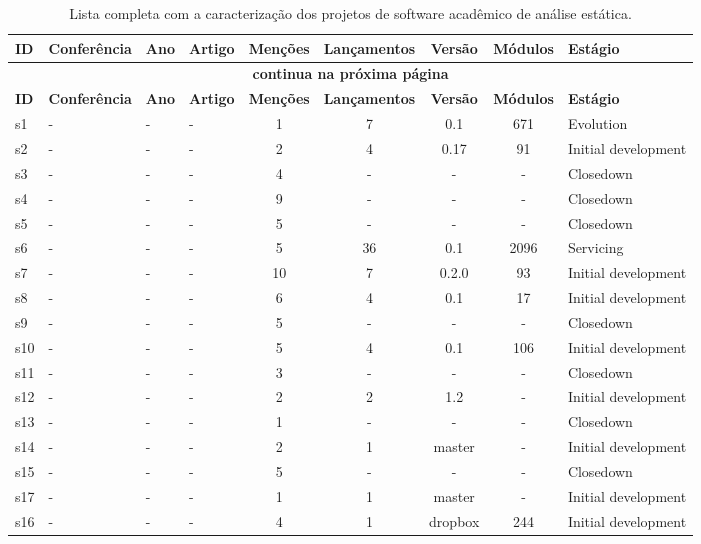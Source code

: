 \begin{longtable}{| l | l | l | l | c | c | c | c | l |}
  \caption{Lista completa com a caracterização dos projetos de software acadêmico de análise estática.}
  \label{dataset-table} \\
  \hline
  \endfirsthead
  \hline
  \textbf{ID} & \textbf{Conferência} & \textbf{Ano} & \textbf{Artigo} & \textbf{Menções} & \textbf{Lançamentos} & \textbf{Versão} & \textbf{Módulos} & \textbf{Estágio} \\
  \hline
  \endhead
  \multicolumn{9}{c}{\textbf{continua na próxima página}} \\
  \hhline{---------} \endfoot
  \endlastfoot
  \textbf{ID} & \textbf{Conferência} & \textbf{Ano} & \textbf{Artigo} & \textbf{Menções} & \textbf{Lançamentos} & \textbf{Versão} & \textbf{Módulos} & \textbf{Estágio} \\
  \hline
s1 & - & - & - & 1 & 7 & 0.1 & 671 & Evolution \\
    \hline
s2 & - & - & - & 2 & 4 & 0.17 & 91 & Initial development \\
    \hline
s3 & - & - & - & 4 & - & - & - & Closedown \\
    \hline
s4 & - & - & - & 9 & - & - & - & Closedown \\
    \hline
s5 & - & - & - & 5 & - & - & - & Closedown \\
    \hline
s6 & - & - & - & 5 & 36 & 0.1 & 2096 & Servicing \\
    \hline
s7 & - & - & - & 10 & 7 & 0.2.0 & 93 & Initial development \\
    \hline
s8 & - & - & - & 6 & 4 & 0.1 & 17 & Initial development \\
    \hline
s9 & - & - & - & 5 & - & - & - & Closedown \\
    \hline
s10 & - & - & - & 5 & 4 & 0.1 & 106 & Initial development \\
    \hline
s11 & - & - & - & 3 & - & - & - & Closedown \\
    \hline
s12 & - & - & - & 2 & 2 & 1.2 & - & Initial development \\
    \hline
s13 & - & - & - & 1 & - & - & - & Closedown \\
    \hline
s14 & - & - & - & 2 & 1 & master & - & Initial development \\
    \hline
s15 & - & - & - & 5 & - & - & - & Closedown \\
    \hline
s17 & - & - & - & 1 & 1 & master & - & Initial development \\
    \hline
s16 & - & - & - & 4 & 1 & dropbox & 244 & Initial development \\

\end{longtable}
